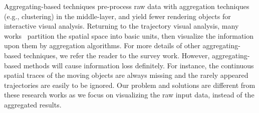 {Aggregating-based techniques pre-process raw data with aggregation techniques (e.g., clustering) in the middle-layer, and yield fewer rendering objects for interactive visual analysis.}
Returning to the trajectory visual analysis,
many works~\cite{wood2010visualisation,guo2009flow,von2015mobilitygraphs} partition the {spatial space} into basic units,
then visualize the information upon them by aggregation algorithms.
For more details of other aggregating-based techniques, we refer the reader to the survey work.
However, aggregating-based methods will cause information loss definitely.
For instance, the continuous spatial traces of the moving objects are always missing and the rarely appeared trajectories are easily to be ignored.
Our problem and solutions are different from these research works as we focus on visualizing the raw input data, instead of the aggregated results.


